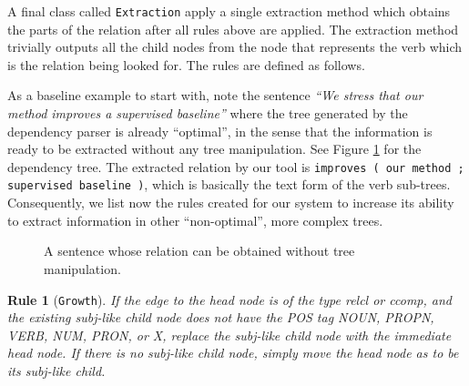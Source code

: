 \documentclass[11pt,a4paper,openright]{memoir}
\newtheorem{treerule}{Rule}
\begin{document}
A final class called \texttt{Extraction} apply a single extraction method which obtains the parts of the relation after all rules above are applied. The extraction method trivially outputs all the child nodes from the node that represents the verb which is the relation being looked for. The rules are defined as follows.

As a baseline example to start with, note the sentence \emph{\enquote{We stress that our method improves a supervised baseline}} where the tree generated by the dependency parser is already \enquote{optimal}, in the sense that the information is ready to be extracted without any tree manipulation. See Figure \ref{fig:no_rule} for the dependency tree. The extracted relation by our tool is \texttt{improves ( our method ; supervised baseline )}, which is basically the text form of the verb sub-trees. Consequently, we list now the rules created for our system to increase its ability to extract information in other \enquote{non-optimal}, more complex trees. 


\begin{figure}[!htbp]

\centering
{}

\caption[A sentence whose relation can be obtained without tree manipulation.]{A sentence whose relation can be obtained without tree manipulation.}
\label{fig:no_rule}
\end{figure}


\begin{treerule}[\texttt{Growth}]
\label{treerule:rule1}
If the edge to the head node is of the type \emph{relcl} or \emph{ccomp}, and the existing \emph{subj}-like child node does not have the POS tag \emph{NOUN}, \emph{PROPN}, \emph{VERB}, \emph{NUM}, \emph{PRON}, or \emph{X}, replace the \emph{subj}-like child node with the immediate head node. If there is no \emph{subj}-like child node, simply move the head node as to be its \emph{subj}-like child.
\end{treerule}
\end{document}

